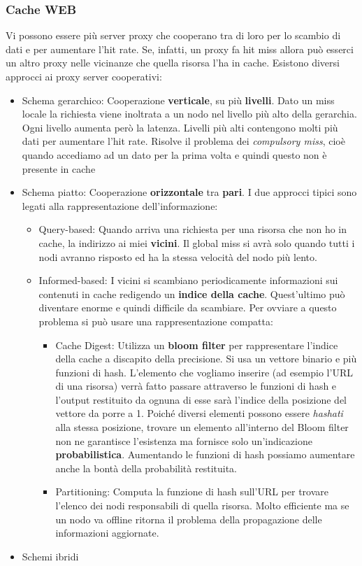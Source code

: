 \documentclass{article}
\begin{document}
		\subsubsection{Cache WEB}
		Vi possono essere più server proxy che cooperano tra di loro per lo scambio di dati e per aumentare l'hit rate. Se, infatti, un proxy fa hit miss allora può esserci un altro proxy nelle vicinanze che quella risorsa l'ha in cache. Esistono diversi approcci ai proxy server cooperativi:
		\begin{itemize}
		    \item Schema gerarchico: Cooperazione \textbf{verticale}, su più \textbf{livelli}. Dato un miss locale la richiesta viene inoltrata a un nodo nel livello più alto della gerarchia. Ogni livello aumenta però la latenza. Livelli più alti contengono molti più dati per aumentare l'hit rate. Risolve il problema dei \textit{compulsory miss}, cioè quando accediamo ad un dato per la prima volta e quindi questo non è presente in cache
		    \item Schema piatto: Cooperazione \textbf{orizzontale} tra \textbf{pari}. I due approcci tipici sono legati alla rappresentazione dell'informazione:
		    \begin{itemize}
		    	\item Query-based: Quando arriva una richiesta per una risorsa che non ho in cache, la indirizzo ai miei \textbf{vicini}. Il global miss si avrà solo quando tutti i nodi avranno risposto ed ha la stessa velocità del nodo più lento.
		    	\item Informed-based: I vicini si scambiano periodicamente informazioni sui contenuti in cache redigendo un \textbf{indice della cache}. Quest'ultimo può diventare enorme e quindi difficile da scambiare. Per ovviare a questo problema si può usare una rappresentazione compatta:
			    \begin{itemize}
			    	\item Cache Digest: Utilizza un \textbf{bloom filter} per rappresentare l'indice della cache a discapito della precisione. Si usa un vettore binario e più funzioni di hash. L'elemento che vogliamo inserire (ad esempio l'URL di una risorsa) verrà fatto passare attraverso le funzioni di hash e l'output restituito da ognuna di esse sarà l'indice della posizione del vettore da porre a 1. Poiché diversi elementi possono essere \textit{hashati} alla stessa posizione, trovare un elemento all'interno del Bloom filter non ne garantisce l'esistenza ma fornisce solo un'indicazione \textbf{probabilistica}. Aumentando le funzioni di hash possiamo aumentare anche la bontà della probabilità restituita.
			    	\item Partitioning: Computa la funzione di hash sull'URL per trovare l'elenco dei nodi responsabili di quella risorsa. Molto efficiente ma se un nodo va offline ritorna il problema della propagazione delle informazioni aggiornate.
			    \end{itemize}
			\end{itemize}
		    
		    \item Schemi ibridi
		\end{itemize}
		
\end{document}
